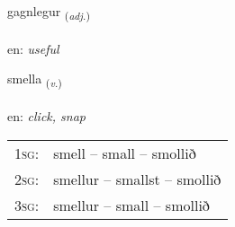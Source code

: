 \documentclass[frontgrid, backgrid]{flacards}\usepackage[]{graphicx}\usepackage[]{xcolor}
\begin{document}
\renewcommand{\blhead}{\vskip5pt {\small\bfseries\footnotesize Lýsingarorð | Adjective }}
\renewcommand{\bcfoot}{\vskip5pt \hspace{2pt}{\small\bfseries\footnotesize 3K}}


{gagnlegur \small{\textsubscript{(\textit{adj.})}} \\[1ex] %
\textphonetic{[kaklɛɣʏr]} \\
en: \emph{useful} \\  [2ex]
\renewcommand*{\arraystretch}{0.8}
}

\renewcommand{\flhead}{\vskip5pt \fboxsep=0pt {\small\bfseries\footnotesize Sagnorð | Verb}}
\renewcommand{\fcfoot}{\vskip5pt \fboxsep=0pt \hspace{2pt}{\small\bfseries\footnotesize 3K}}

\renewcommand{\blhead}{\vskip5pt {\small\bfseries\footnotesize Sagnorð | Verb }}
\renewcommand{\bcfoot}{\vskip5pt \hspace{2pt}{\small\bfseries\footnotesize 3K}}


{smella \small{\textsubscript{(\textit{v.})}} \\[1ex] %
\textphonetic{[smɛtla]} \\
en: \emph{click, snap} \\  [2ex]
\renewcommand*{\arraystretch}{0.8}
\begin{tabular}{p{1cm}l}
\textsc{1sg}: & smell -- small -- smollið \\ 
\textsc{2sg}: & smellur -- smallst -- smollið \\ 
\textsc{3sg}: & smellur -- small -- smollið \\ 
\end{tabular}
}
\end{document}
